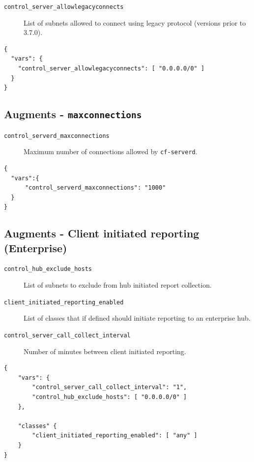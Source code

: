 \documentclass[11pt]{article}
\begin{document}
\begin{description}
\item[{\texttt{control\_server\_allowlegacyconnects}}] List of subnets allowed to connect
using legacy protocol (versions prior to 3.7.0).
\end{description}

\begin{verbatim}
{
  "vars": {
    "control_server_allowlegacyconnects": [ "0.0.0.0/0" ]
  }
}
\end{verbatim}

\subsection*{Augments - \texttt{maxconnections}}
\label{sec:org2d82bcb}

\begin{description}
\item[{\texttt{control\_serverd\_maxconnections}}] Maximum number of connections allowed by
\texttt{cf-serverd}.
\end{description}

\begin{verbatim}
{
  "vars":{
      "control_serverd_maxconnections": "1000"
  }
}
\end{verbatim}

\subsection*{Augments - Client initiated reporting (Enterprise)}
\label{sec:org350c13d}

\begin{description}
\item[{\texttt{control\_hub\_exclude\_hosts}}] List of subnets to exclude from hub initiated
report collection.
\item[{\texttt{client\_initiated\_reporting\_enabled}}] List of classes that if defined should
initiate reporting to an enterprise hub.
\item[{\texttt{control\_server\_call\_collect\_interval}}] Number of minutes between client
initiated reporting.
\end{description}

\begin{verbatim}
{
    "vars": {
        "control_server_call_collect_interval": "1",
        "control_hub_exclude_hosts": [ "0.0.0.0/0" ]
    },

    "classes" {
        "client_initiated_reporting_enabled": [ "any" ]
    }
}
\end{verbatim}
\end{document}
